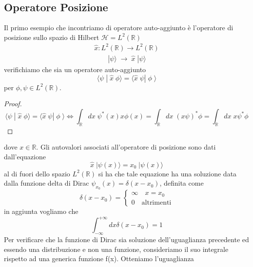 \subsection{Operatore Posizione}
Il primo esempio che incontriamo di operatore auto-aggiunto \`e l'operatore di posizione sullo spazio di Hilbert $\mathcal{H} = L^2(\mathbb{R})$
\begin{equation*}
\begin{array}{l}
	\hat{x} : L^2(\mathbb{R}) \to L^2(\mathbb{R}) \\[0,2cm]
	\quad \quad | \psi \rangle \; \to \; \hat{x} \; | \psi \rangle 
\end{array}
\end{equation*}
verifichiamo che sia un operatore auto-aggiunto 
\begin{equation*}
	\langle \psi \; | \; \hat{x} \;\phi \rangle = \langle \hat{x} \; \psi|\; \phi \; \rangle 
\end{equation*}
per $\phi, \psi \in L^2(\mathbb{R})$.
\begin{proof}
\begin{equation*}
	\langle \psi \; | \; \hat{x} \;\phi \rangle = \langle \hat{x} \; \psi|\; \phi \; \rangle \iff \int_{\mathbb{R}}dx \; \psi^*(x) x \phi(x) = \int_{\mathbb{R}}dx \; (x\psi)^*\phi  = \int_{\mathbb{R}}dx \; x \psi^*\phi  
\end{equation*}
\end{proof}
\noindent dove $x \in \mathbb{R}$. Gli autovalori associati all'operatore di posizione sono dati dall'equazione 
\begin{equation*}
	\hat{x} \; |\psi(x)\rangle  = x_0 \; |\psi(x) \rangle 
\end{equation*}
al di fuori dello spazio $L^2(\mathbb{R})$ si ha che tale equazione ha una soluzione data dalla funzione delta di Dirac $\psi_{x_0}(x) = \delta(x-x_0)$, definita come 
\begin{equation*}
	\delta(x-x_0) = \left \{ \begin{array}{l}
		\infty \quad x = x_0 \\
		0 \quad \text{altrimenti}
	\end{array}\right.
\end{equation*}
in aggiunta vogliamo che 
\begin{equation*}
	\int_{-\infty}^{+\infty} d x \delta(x-x_0)=1
\end{equation*}
Per verificare che la funzione di Dirac sia soluzione dell'uguaglianza precedente ed essendo una distribuzione e non una funzione, consideriamo il suo integrale rispetto ad una generica funzione f(x). Otteniamo l'uguaglianza
